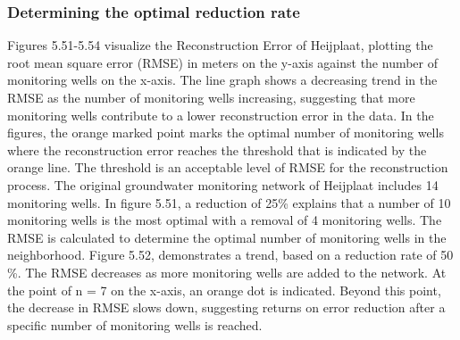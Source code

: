 \subsubsection{Determining the optimal reduction rate}
Figures 5.51-5.54 visualize the Reconstruction Error of Heijplaat, plotting the root mean square error (RMSE) in meters on the y-axis against the number of monitoring wells on the x-axis. The line graph shows a decreasing trend in the RMSE as the number of monitoring wells increasing, suggesting that more monitoring wells contribute to a lower reconstruction error in the data. In the figures, the orange marked point marks the optimal number of monitoring wells where the reconstruction error reaches the threshold that is indicated by the orange line. The threshold is an acceptable level of RMSE for the reconstruction process. The original groundwater monitoring network of Heijplaat includes 14 monitoring wells. 
\newline
In figure 5.51, a reduction of 25\% explains that a number of 10 monitoring wells is the most optimal with a removal of 4 monitoring wells. The RMSE is calculated to determine the optimal number of monitoring wells in the neighborhood. Figure 5.52, demonstrates a trend, based on a reduction rate of 50 \%. The RMSE decreases as more monitoring wells are added to the network. At the point of n = 7 on the x-axis, an orange dot is indicated. Beyond this point, the decrease in RMSE slows down, suggesting returns on error reduction after a specific number of monitoring wells is reached. 


